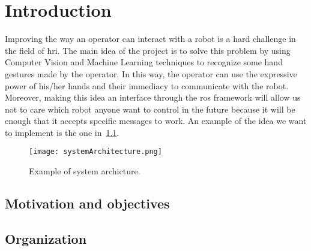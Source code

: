 \documentclass[../thesis.tex]{subfiles}
\begin{document}
\chapter{Introduction}\label{cap:introduction}
Improving the way an operator can interact with a robot is a hard challenge in the field of \gls{hri}. The main idea of the project is to solve this problem by using Computer Vision and Machine Learning techniques to recognize some hand gestures made by the operator. In this way, the operator can use the expressive power of his/her hands and their immediacy to communicate with the robot. Moreover, making this idea an interface through the \gls{ros} framework will allow us not to care which robot anyone want to control in the future because it will be enough that it accepts specific messages to work. An example of the idea we want to implement is the one in~\ref{fig:systemArchitecture}.

\begin{figure}[H]
  \centering
  \texttt{[image: systemArchitecture.png]}
  \caption{Example of system archicture.}
  \label{fig:systemArchitecture}
\end{figure}

\section{Motivation and objectives}\label{s:motivation-and-objectives}


\section{Organization}\label{s:organization}
\end{document}
